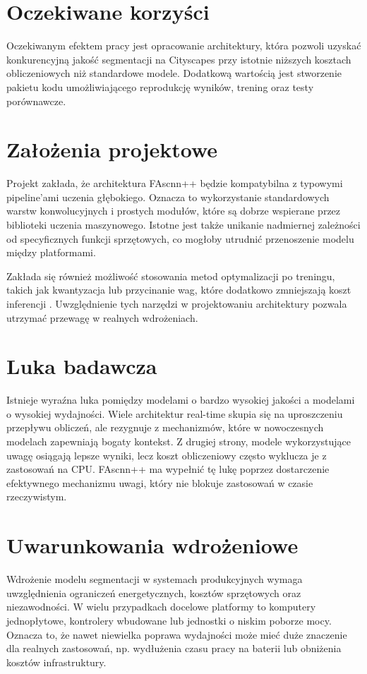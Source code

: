 \documentclass[12pt,oneside,a4paper]{report}
\begin{document}
\section{Oczekiwane korzyści}
Oczekiwanym efektem pracy jest opracowanie architektury, która pozwoli uzyskać
konkurencyjną jakość segmentacji na Cityscapes przy istotnie niższych kosztach
obliczeniowych niż standardowe modele. Dodatkową wartością jest stworzenie
pakietu kodu umożliwiającego reprodukcję wyników, trening oraz testy porównawcze.

\section{Założenia projektowe}
Projekt zakłada, że architektura FAscnn++ będzie kompatybilna z typowymi pipeline'ami
uczenia głębokiego. Oznacza to wykorzystanie standardowych warstw konwolucyjnych
i prostych modułów, które są dobrze wspierane przez biblioteki uczenia maszynowego.
Istotne jest także unikanie nadmiernej zależności od specyficznych funkcji
sprzętowych, co mogłoby utrudnić przenoszenie modelu między platformami.

Zakłada się również możliwość stosowania metod optymalizacji po treningu, takich
jak kwantyzacja lub przycinanie wag, które dodatkowo zmniejszają koszt
inferencji \parencite{jacob2018quantization,han2015deepcompression}.
Uwzględnienie tych narzędzi w projektowaniu architektury pozwala utrzymać
przewagę w realnych wdrożeniach.

\section{Luka badawcza}
Istnieje wyraźna luka pomiędzy modelami o bardzo wysokiej jakości a modelami
o wysokiej wydajności. Wiele architektur real-time skupia się na uproszczeniu
przepływu obliczeń, ale rezygnuje z mechanizmów, które w nowoczesnych modelach
zapewniają bogaty kontekst. Z drugiej strony, modele wykorzystujące uwagę
osiągają lepsze wyniki, lecz koszt obliczeniowy często wyklucza je z zastosowań
na CPU. FAscnn++ ma wypełnić tę lukę poprzez dostarczenie efektywnego mechanizmu
uwagi, który nie blokuje zastosowań w czasie rzeczywistym.

\section{Uwarunkowania wdrożeniowe}
Wdrożenie modelu segmentacji w systemach produkcyjnych wymaga uwzględnienia
ograniczeń energetycznych, kosztów sprzętowych oraz niezawodności. W wielu
przypadkach docelowe platformy to komputery jednopłytowe, kontrolery wbudowane
lub jednostki o niskim poborze mocy. Oznacza to, że nawet niewielka poprawa
wydajności może mieć duże znaczenie dla realnych zastosowań, np. wydłużenia
czasu pracy na baterii lub obniżenia kosztów infrastruktury.
\end{document}
